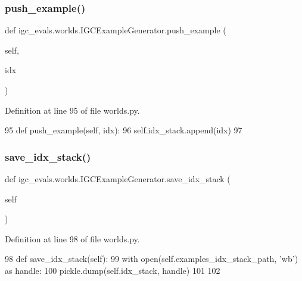 \subsubsection{\texorpdfstring{push\+\_\+example()}{push\_example()}}
{\footnotesize\ttfamily def igc\+\_\+evals.\+worlds.\+I\+G\+C\+Example\+Generator.\+push\+\_\+example (\begin{DoxyParamCaption}\item[{}]{self,  }\item[{}]{idx }\end{DoxyParamCaption})}



Definition at line 95 of file worlds.\+py.


\begin{DoxyCode}
95     \textcolor{keyword}{def }push\_example(self, idx):
96         self.idx\_stack.append(idx)
97 
\end{DoxyCode}
\mbox{\label{classigc__evals_1_1worlds_1_1IGCExampleGenerator_a3f787da040d9b83d9c857b8ef65d36eb}} 
\subsubsection{\texorpdfstring{save\+\_\+idx\+\_\+stack()}{save\_idx\_stack()}}
{\footnotesize\ttfamily def igc\+\_\+evals.\+worlds.\+I\+G\+C\+Example\+Generator.\+save\+\_\+idx\+\_\+stack (\begin{DoxyParamCaption}\item[{}]{self }\end{DoxyParamCaption})}



Definition at line 98 of file worlds.\+py.


\begin{DoxyCode}
98     \textcolor{keyword}{def }save\_idx\_stack(self):
99         with open(self.examples\_idx\_stack\_path, \textcolor{stringliteral}{'wb'}) \textcolor{keyword}{as} handle:
100             pickle.dump(self.idx\_stack, handle)
101 
102 
\end{DoxyCode}


